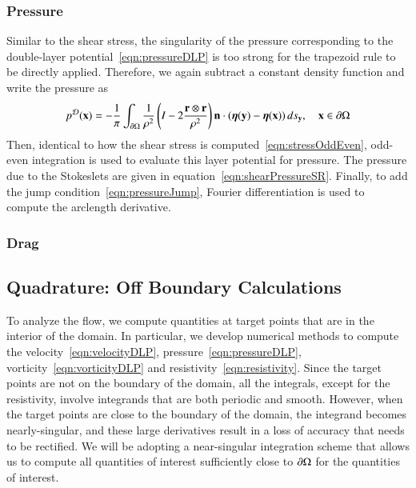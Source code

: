 \documentclass[preprint, 10pt]{elsarticle}
\begin{document}
\subsubsection{Pressure}
Similar to the shear stress, the singularity of the pressure
corresponding to the double-layer potential~\eqref{eqn:pressureDLP} is
too strong for the trapezoid rule to be directly applied.  Therefore, we
again subtract a constant density function and write the pressure as
\begin{align*}
  p^{\mathcal{D}}({\mathbf{x}}) = -\frac{1}{\pi}\int_{{\partial}\Omega} \frac{1}{\rho^2}
    \left(I - 2 \frac{{\mathbf{r}} \otimes {\mathbf{r}}}{\rho^2}\right) 
    {\mathbf{n}} \cdot ({\boldsymbol\eta}({\mathbf{y}}) - {\boldsymbol\eta}({\mathbf{x}})) \,ds_{\mathbf{y}}, 
    \quad {\mathbf{x}} \in {\partial}\Omega
\end{align*}
Then, identical to how the shear stress is
computed~\eqref{eqn:stressOddEven}, odd-even integration is used to
evaluate this layer potential for pressure.  The pressure due to the
Stokeslets are given in equation~\eqref{eqn:shearPressureSR}.  Finally,
to add the jump condition~\eqref{eqn:pressureJump}, Fourier
differentiation is used to compute the arclength derivative. 


\subsubsection{Drag}



\subsection{Quadrature: Off Boundary Calculations} 
\label{sec:off_boundary}
To analyze the flow, we compute quantities at target points that are in
the interior of the domain.  In particular, we develop numerical methods
to compute the velocity~\eqref{eqn:velocityDLP},
pressure~\eqref{eqn:pressureDLP}, vorticity~\eqref{eqn:vorticityDLP} and
resistivity~\eqref{eqn:resistivity}.  Since the target points are not on
the boundary of the domain, all the integrals, except for the
resistivity, involve integrands that are both periodic and smooth.
However, when the target points are close to the boundary of the domain,
the integrand becomes nearly-singular, and these large derivatives
result in a loss of accuracy that needs to be rectified.  We will be
adopting a near-singular integration scheme that allows us to compute
all quantities of interest sufficiently close to ${\partial}\Omega$ for the
quantities of interest.
\end{document}
